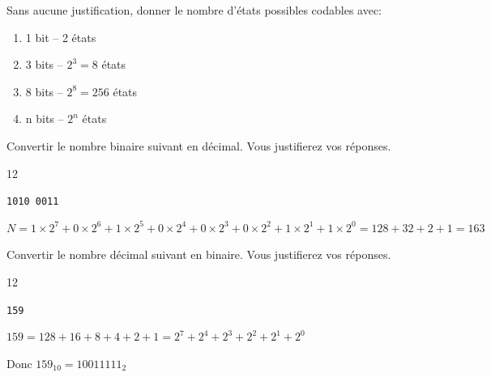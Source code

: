 \documentclass[a4paper,10pt]{report}
\def\ptsexoA{2}
\def\ptsexoB{1}
\def\ptsexoC{1}
\begin{document}

\renewcommand{\labelitemi}{\textbullet} %


\pagestyle{DS_FP}          %
\NomPrenomNote{}


\exods{\ptsexoA}

Sans aucune justification, donner le nombre d'états possibles codables avec:

\begin{enumerate}[1)]
    \item 1 bit  -- 2 états
    \item 3 bits -- $2^3=8$ états 
    \item 8 bits -- $2^8=256$ états 
    \item n bits -- $2^n$ états 
\end{enumerate}

\medskip


\begin{minipage}{0.49\linewidth}
 \exods{\ptsexoB}

   Convertir le nombre binaire suivant en décimal. Vous justifierez vos réponses.

\begin{answer}{1}{2} 
    \begin{center}
        \verb|1010 0011|
    \end{center}  
    
    $N = 1\times2^7 + 0\times2^6 + 1\times2^5 + 0\times2^4 + 0\times2^3 + 0\times2^2 + 1\times2^1 + 1\times2^0 = 128 + 32 + 2 + 1 = 163$
\end{answer}
\end{minipage}\hfill
\begin{minipage}{0.49\linewidth}
     \exods{\ptsexoC}

    Convertir le nombre décimal suivant en binaire. Vous justifierez vos réponses.
\begin{answer}{1}{2} 
    \begin{center}
        \verb|159|
\end{center}   

    $159 = 128 + 16 + 8 + 4 + 2 + 1 = 2^7 + 2^4 + 2^3 + 2^2 + 2^1 + 2^0$
    
Donc $159_{10} = 10011111_2$
\end{answer}
\end{minipage}
\end{document}
